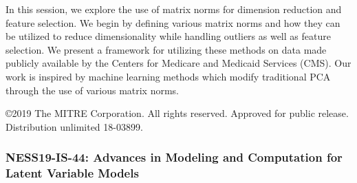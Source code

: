 \begin{itemize}
In this session, we explore the use of matrix norms for dimension reduction and feature selection.  We begin by defining various matrix norms and how they can be utilized to reduce dimensionality while handling outliers as well as feature selection. We present a framework for utilizing these methods on data made publicly available by the Centers for Medicare and Medicaid Services (CMS). Our work is inspired by machine learning methods which modify traditional PCA through the use of various matrix norms. 

©2019 The MITRE Corporation. All rights reserved. Approved for public release. Distribution unlimited 18-03899. 

\end{itemize}

\subsubsection*{NESS19-IS-44: Advances in Modeling and Computation for Latent Variable Models}


